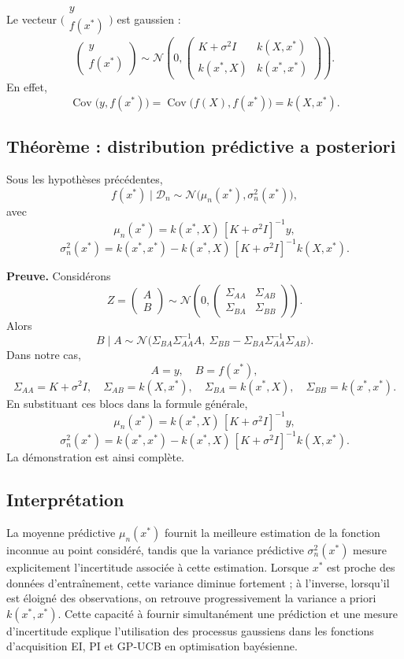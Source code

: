 \documentclass[12pt]{article}
\newcommand{\N}{\mathcal{N}}
\newcommand{\D}{\mathcal{D}}
\newcommand{\K}{K}
\newcommand{\xs}{x^{*}}
\DeclareMathOperator{\Cov}{Cov}
\begin{document}
Le vecteur $\bigl(\begin{smallmatrix} y \\ f(\xs) \end{smallmatrix}\bigr)$ est
gaussien :
\[
\boxed{\;
\begin{pmatrix} y \\ f(\xs) \end{pmatrix}
\sim \N\!\left( 0,
\begin{pmatrix} \K + \sigma^2 I & k(X,\xs) \\ k(\xs,X) & k(\xs,\xs) \end{pmatrix}
\right). \;}
\]
En effet,
\[
\Cov\bigl(y, f(\xs)\bigr) = \Cov\bigl(f(X), f(\xs)\bigr) = k(X,\xs).
\]

\subsection*{Théorème : distribution prédictive a posteriori}

Sous les hypothèses précédentes,
\[
\boxed{\, f(\xs) \mid \D_n \sim \N\bigl(\mu_n(\xs), \sigma_n^2(\xs)\bigr), \,}
\]
avec
\[
\boxed{\, \mu_n(\xs) = k(\xs,X)\,[\K + \sigma^2 I]^{-1} y, \,}
\]
\[
\boxed{\, \sigma_n^2(\xs) = k(\xs,\xs) - k(\xs,X)\,[\K + \sigma^2 I]^{-1} k(X,\xs). \,}
\]

\textbf{Preuve.} Considérons
\[
Z = \begin{pmatrix} A \\ B \end{pmatrix}
\sim \N\!\left( 0,
\begin{pmatrix} \Sigma_{AA} & \Sigma_{AB} \\ \Sigma_{BA} & \Sigma_{BB} \end{pmatrix}
\right).
\]
Alors
\[
B \mid A \sim \N\bigl(
\Sigma_{BA}\Sigma_{AA}^{-1} A,\
\Sigma_{BB} - \Sigma_{BA}\Sigma_{AA}^{-1}\Sigma_{AB}
\bigr).
\]
Dans notre cas,
\[
A = y, \quad B = f(\xs),
\]
\[
\Sigma_{AA} = \K + \sigma^2 I,\quad
\Sigma_{AB} = k(X,\xs),\quad
\Sigma_{BA} = k(\xs,X),\quad
\Sigma_{BB} = k(\xs,\xs).
\]
En substituant ces blocs dans la formule générale,
\[
\mu_n(\xs) = k(\xs,X)\,[\K + \sigma^2 I]^{-1} y,
\]
\[
\sigma_n^2(\xs) = k(\xs,\xs) - k(\xs,X)\,[\K + \sigma^2 I]^{-1} k(X,\xs).
\]
La démonstration est ainsi complète.

\subsection*{Interprétation}

La moyenne prédictive $\mu_n(\xs)$ fournit la meilleure estimation de la fonction
inconnue au point considéré, tandis que la variance prédictive $\sigma_n^2(\xs)$
mesure explicitement l'incertitude associée à cette estimation. Lorsque $\xs$ est
proche des données d'entraînement, cette variance diminue fortement ; à l'inverse,
lorsqu'il est éloigné des observations, on retrouve progressivement la variance a
priori $k(\xs,\xs)$. Cette capacité à fournir simultanément une prédiction et une
mesure d'incertitude explique l'utilisation des processus gaussiens dans les
fonctions d'acquisition EI, PI et GP-UCB en optimisation bayésienne.
\end{document}
